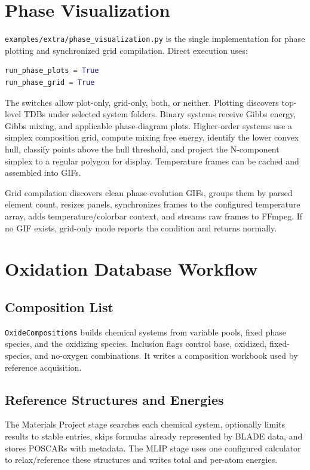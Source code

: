 \documentclass[11pt,letterpaper]{article}
\newcommand{\file}[1]{\nolinkurl{#1}}
\begin{document}
\section{Phase Visualization}

\file{examples/extra/phase_visualization.py} is the single implementation for
phase plotting and synchronized grid compilation. Direct execution uses:
\begin{lstlisting}[language=Python]
run_phase_plots = True
run_phase_grid = True
\end{lstlisting}

The switches allow plot-only, grid-only, both, or neither. Plotting discovers
top-level TDBs under selected system folders. Binary systems receive Gibbs
energy, Gibbs mixing, and applicable phase-diagram plots. Higher-order systems
use a simplex composition grid, compute mixing free energy, identify the lower
convex hull, classify points above the hull threshold, and project the
N-component simplex to a regular polygon for display. Temperature frames can
be cached and assembled into GIFs.

Grid compilation discovers clean phase-evolution GIFs, groups them by parsed
element count, resizes panels, synchronizes frames to the configured
temperature array, adds temperature/colorbar context, and streams raw frames
to FFmpeg. If no GIF exists, grid-only mode reports the condition and returns
normally.

\section{Oxidation Database Workflow}

\subsection{Composition List}

\file{OxideCompositions} builds chemical systems from variable pools, fixed
phase species, and the oxidizing species. Inclusion flags control base,
oxidized, fixed-species, and no-oxygen combinations. It writes a composition
workbook used by reference acquisition.

\subsection{Reference Structures and Energies}

The Materials Project stage searches each chemical system, optionally limits
results to stable entries, skips formulas already represented by BLADE data,
and stores POSCARs with metadata. The MLIP stage uses one configured
calculator to relax/reference these structures and writes total and per-atom
energies.
\end{document}
